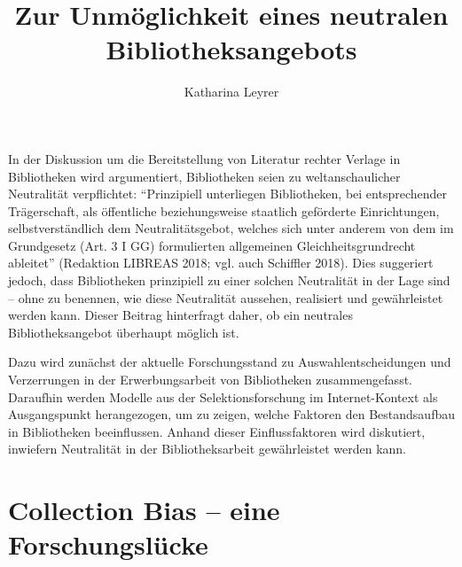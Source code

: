 \documentclass[a4paper,
fontsize=11pt,
oneside,
numbers=noperiodatend,
parskip=half-,
bibliography=totoc,
final
]{scrartcl}
\title{\LARGE{Zur Unmöglichkeit eines neutralen Bibliotheksangebots}}%
\author{Katharina Leyrer} %
\date{}
\begin{document}
\maketitle
\thispagestyle{fancyplain} 


In der Diskussion um die Bereitstellung von Literatur rechter Verlage in
Bibliotheken wird argumentiert, Bibliotheken seien zu weltanschaulicher
Neutralität verpflichtet: \enquote{Prinzipiell unterliegen Bibliotheken,
bei entsprechender Trägerschaft, als öffentliche beziehungsweise
staatlich geförderte Einrichtungen, selbstverständlich dem
Neutralitätsgebot, welches sich unter anderem von dem im Grundgesetz
(Art. 3 I GG)
formulierten allgemeinen Gleichheitsgrundrecht ableitet} (Redaktion LIBREAS 2018;
vgl. auch Schiffler 2018). Dies suggeriert jedoch, dass Bibliotheken
prinzipiell zu einer solchen Neutralität in der Lage sind -- ohne zu
benennen, wie diese Neutralität aussehen, realisiert und gewährleistet
werden kann. Dieser Beitrag hinterfragt daher, ob ein neutrales
Bibliotheksangebot überhaupt möglich ist.

Dazu wird zunächst der aktuelle Forschungsstand zu Auswahlentscheidungen
und Verzerrungen in der Erwerbungsarbeit von Bibliotheken
zusammengefasst. Daraufhin werden Modelle aus der Selektionsforschung im
Internet-Kontext als Ausgangspunkt herangezogen, um zu zeigen, welche
Faktoren den Bestandsaufbau in Bibliotheken beeinflussen. Anhand dieser
Einflussfaktoren wird diskutiert, inwiefern Neutralität in der
Bibliotheksarbeit gewährleistet werden kann.

\hypertarget{collection-bias-eine-forschungsluxfccke}{%
\section{Collection Bias -- eine
Forschungslücke}\label{collection-bias-eine-forschungsluxfccke}}
\end{document}
